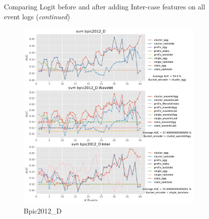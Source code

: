 \documentclass[twoside,11pt]{Latex/Classes/PhDthesisPSnPDF}
\begin{document}
\begin{figure}[!htbp]
\caption{Comparing Logit before and after adding Inter-case features on all event logs (\textit{continued})}
\label{fig:interl3}
\end{figure}




\begin{figure}[!htbp] %

	\begin{subfigure}{0.48\textwidth}
		\includegraphics[width=\linewidth]{images/inter/svm/bpic2012_D.pdf}
		\caption{Bpic2012\_D} \label{fig:b12di}
	\end{subfigure}\hspace*{\fill}
	\begin{subfigure}{0.48\textwidth}

\end{subfigure}
\end{figure}
\end{document}
